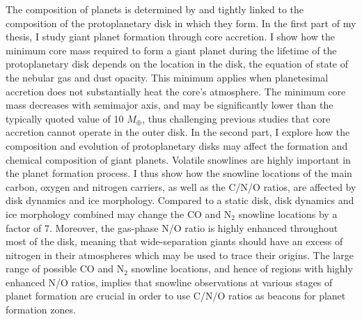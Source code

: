 \doublespacing

The composition of planets is determined by and tightly linked to the composition of the protoplanetary disk in which they form. In the first part of my thesis, I study giant planet formation through core accretion. I show how the minimum core mass required to form a giant planet during the lifetime of the protoplanetary disk depends on the location in the disk, the equation of state of the nebular gas and dust opacity. This minimum applies when planetesimal accretion does not substantially heat the core's atmosphere. The minimum core mass decreases with semimajor axis, and may be significantly lower than the typically quoted value of 10 $M_{\oplus}$, thus challenging previous studies that core accretion cannot operate in the outer disk. In the second part, I explore how the composition and evolution of protoplanetary disks may affect the formation and chemical composition of giant planets. Volatile snowlines are highly important in the planet formation process. I thus show how the snowline locations of the main carbon, oxygen and nitrogen carriers, as well as the C/N/O ratios, are affected by disk dynamics and ice morphology. Compared to a static disk, disk dynamics and ice morphology combined may change the CO and N$_2$ snowline locations by a factor of 7. Moreover, the gas-phase N/O ratio is highly enhanced throughout most of the disk, meaning that wide-separation giants should have an excess of nitrogen in their atmospheres which may be used to trace their origins. The large range of possible CO and N$_2$ snowline locations, and hence of regions with highly enhanced N/O ratios, implies that snowline observations at various stages of planet formation are crucial in order to use C/N/O ratios as beacons for planet formation zones.  
